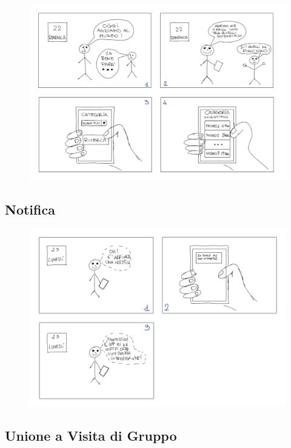 \begin{figure}[h]
    \centering
    \includegraphics[width=1.0\textwidth]{images/storyboards/Storyboard-2-ricerca-notitle.png}
\end{figure}

\newpage

\subsection{Notifica}

\begin{figure}[h]
    \centering
    \includegraphics[width=1.0\textwidth]{images/storyboards/Storyboard-3-notifica-notitle.png}
\end{figure}

\newpage

\subsection{Unione a Visita di Gruppo}

